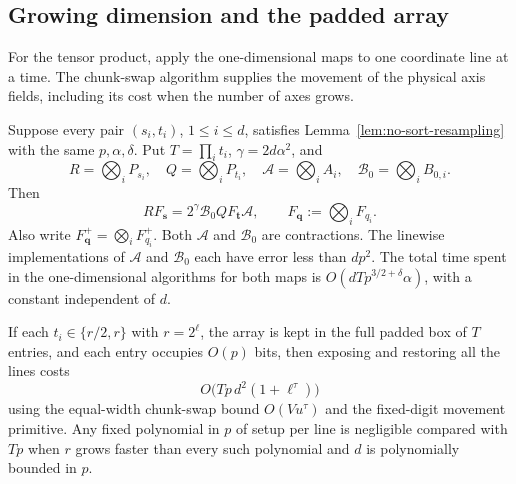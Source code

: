 \subsection{Growing dimension and the padded array}

For the tensor product, apply the one-dimensional maps to one coordinate
line at a time. The chunk-swap algorithm supplies the movement of the
physical axis fields, including its cost when the number of axes grows.

\begin{lemma}
\label{lem:tensor-resampling}
Suppose every pair $(s_i,t_i)$, $1\leq i\leq d$, satisfies
Lemma~\ref{lem:no-sort-resampling} with the same $p,\alpha,\delta$.
Put $T=\prod_i t_i$, $\gamma=2d\alpha^2$, and
\[
 R=\bigotimes_iP_{s_i},\quad Q=\bigotimes_iP_{t_i},\quad
 \mathcal A=\bigotimes_i A_i,\quad
 \mathcal B_0=\bigotimes_i B_{0,i}.
\]
Then
\begin{equation}
 RF_{\boldsymbol s}
   =2^\gamma\mathcal B_0QF_{\boldsymbol t}\mathcal A,
 \qquad F_{\boldsymbol q}:=\bigotimes_iF_{q_i}.
 \label{eq:no-sort-tensor}
\end{equation}
Also write $F_{\boldsymbol q}^+=\bigotimes_iF_{q_i}^+$.
Both $\mathcal A$ and $\mathcal B_0$ are contractions. The linewise
implementations of $\mathcal A$ and $\mathcal B_0$ each have error
less than $dp^2$. The total time spent in the
one-dimensional algorithms for both maps is
$O(dTp^{3/2+\delta}\alpha)$, with a constant independent of $d$.

If each $t_i\in\{r/2,r\}$ with $r=2^\ell$, the array is kept in the
full padded box of $T$ entries, and each entry occupies $O(p)$ bits,
then exposing and restoring all the lines costs
\[
 O\bigl(Tp\,d^2(1+\ell^\tau)\bigr)
\]
using the equal-width chunk-swap bound $O(Vu^\tau)$ and the fixed-digit
movement primitive. Any fixed polynomial in $p$ of setup per line is
negligible compared with $Tp$ when $r$ grows faster than every such
polynomial and $d$ is polynomially bounded in $p$.
\end{lemma}

